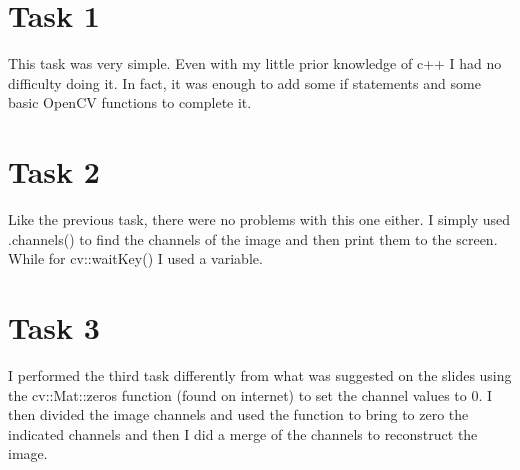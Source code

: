 
%
%         

%





\chapter{Task 1}
This task was very simple. Even with my little prior knowledge of c++ I had no difficulty doing it. In fact, it was enough to add some if statements and some basic OpenCV functions to complete it.

\chapter{Task 2}
Like the previous task, there were no problems with this one either. I simply used .channels() to find the channels of the image and then print them to the screen. While for cv::waitKey() I used a variable.



\chapter{Task 3}
I performed the third task differently from what was suggested on the slides using the cv::Mat::zeros function (found on internet) to set the channel values to 0. I then divided the image channels and used the function to bring to zero the indicated channels and then I did a merge of the channels to reconstruct the image.

